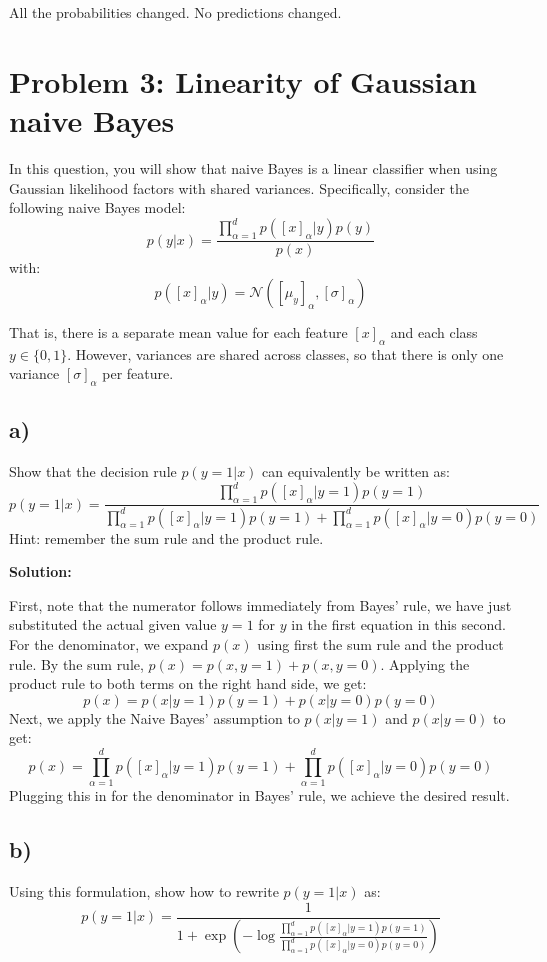 \documentclass[a4paper]{article}
\begin{document}
All the probabilities changed. No predictions changed.

\section*{Problem 3: Linearity of Gaussian naive Bayes}
In this question, you will show that naive Bayes is a linear classifier when using Gaussian likelihood factors with shared variances. Specifically, consider the following naive Bayes model:
$$p\left(y|x\right) = \frac{\prod^{d}_{\alpha=1}p\left(\left[x\right]_{\alpha}|y\right)p\left(y\right)}{p\left(x\right)}$$
with:
$$p\left(\left[x\right]_{\alpha}|y\right) = \mathcal{N}\left(\left[\mu_y\right]_{\alpha}, \left[\sigma\right]_{\alpha}\right)$$

That is, there is a separate mean value for each feature $\left[x\right]_{\alpha}$ and each class $y \in \{0, 1\}$. However, variances are shared across classes, so that there is only one variance $\left[\sigma\right]_{\alpha}$ per feature.
\subsection*{a)} 
Show that the decision rule $p(y=1|x)$ can equivalently be written as:
$$
p(y=1|x) = \frac{\prod_{\alpha=1}^{d} p([x]_{\alpha}|y=1)p(y=1)}{\prod_{\alpha=1}^{d} p([x]_{\alpha}|y=1)p(y=1)+\prod_{\alpha=1}^{d} p([x]_{\alpha}|y=0)p(y=0)}
$$
Hint: remember the sum rule and the product rule.



\textbf{Solution: } 


First, note that the numerator follows immediately from Bayes' rule, we have just substituted the actual given value $y=1$ for $y$ in the first equation in this second. For the denominator, we expand $p(x)$ using first the sum rule and the product rule. By the sum rule, $p(x)=p(x,y=1)+p(x,y=0)$. Applying the product rule to both terms on the right hand side, we get:
\begin{equation*}
	p(x) = p(x|y=1)p(y=1)+p(x|y=0)p(y=0)
\end{equation*}
Next, we apply the Naive Bayes' assumption to $p(x|y=1)$ and $p(x|y=0)$ to get:
\begin{equation*}
	p(x) = \prod_{\alpha=1}^{d} p([x]_{\alpha}|y=1)p(y=1)+\prod_{\alpha=1}^{d} p([x]_{\alpha}|y=0)p(y=0)
\end{equation*}
Plugging this in for the denominator in Bayes' rule, we achieve the desired result.


\subsection*{b)}
Using this formulation, show how to rewrite $p(y=1|x)$ as:
$$
p(y=1|x) = \frac{1}{1+\exp{\left(-\log\frac{\prod_{\alpha=1}^{d} p([x]_{\alpha}|y=1)p(y=1)}{\prod_{\alpha=1}^{d} p([x]_{\alpha}|y=0)p(y=0)}\right)}}
$$
\end{document}
